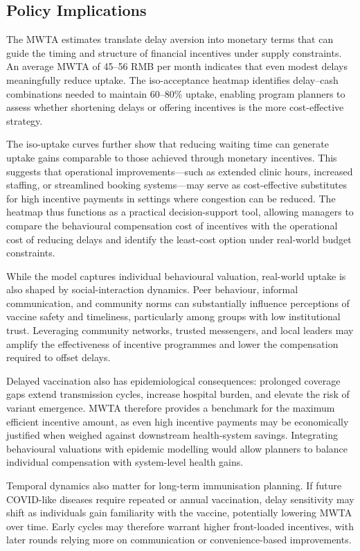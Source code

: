 \documentclass[12pt]{article}
\begin{document}
\subsection{Policy Implications}

The MWTA estimates translate delay aversion into monetary terms that can guide the timing and structure of financial incentives under supply constraints. An average MWTA of 45–56 RMB per month indicates that even modest delays meaningfully reduce uptake. The iso-acceptance heatmap identifies delay–cash combinations needed to maintain 60–80\% uptake, enabling program planners to assess whether shortening delays or offering incentives is the more cost-effective strategy.

The iso-uptake curves further show that reducing waiting time can generate uptake gains comparable to those achieved through monetary incentives. This suggests that operational improvements—such as extended clinic hours, increased staffing, or streamlined booking systems—may serve as cost-effective substitutes for high incentive payments in settings where congestion can be reduced. The heatmap thus functions as a practical decision-support tool, allowing managers to compare the behavioural compensation cost of incentives with the operational cost of reducing delays and identify the least-cost option under real-world budget constraints.

While the model captures individual behavioural valuation, real-world uptake is also shaped by social-interaction dynamics. Peer behaviour, informal communication, and community norms can substantially influence perceptions of vaccine safety and timeliness, particularly among groups with low institutional trust. Leveraging community networks, trusted messengers, and local leaders may amplify the effectiveness of incentive programmes and lower the compensation required to offset delays.

Delayed vaccination also has epidemiological consequences: prolonged coverage gaps extend transmission cycles, increase hospital burden, and elevate the risk of variant emergence. MWTA therefore provides a benchmark for the maximum efficient incentive amount, as even high incentive payments may be economically justified when weighed against downstream health-system savings. Integrating behavioural valuations with epidemic modelling would allow planners to balance individual compensation with system-level health gains.

Temporal dynamics also matter for long-term immunisation planning. If future COVID-like diseases require repeated or annual vaccination, delay sensitivity may shift as individuals gain familiarity with the vaccine, potentially lowering MWTA over time. Early cycles may therefore warrant higher front-loaded incentives, with later rounds relying more on communication or convenience-based improvements.
\end{document}
